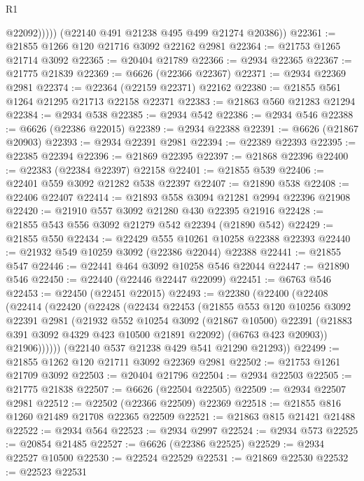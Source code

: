 \begin{lexlean}{R1}
\begin{coremodule}
                @22092)))))
      (@22140 @491 @21238 @495 @499 @21274 @20386))
@22361 := @21855 @1266 @120 @21716 @3092 @22162 @2981
@22364 := @21753 @1265 @21714 @3092
@22365 := @20404 @21789
@22366 := @2934 @22365
@22367 := @21775 @21839
@22369 := @6626 (@22366 @22367)
@22371 := @2934 @22369 @2981
@22374 := @22364 (@22159 @22371) @22162
@22380 := @21855 @561 @1264 @21295 @21713 @22158 @22371
@22383 := @21863 @560 @21283 @21294
@22384 := @2934 @538
@22385 := @2934 @542
@22386 := @2934 @546
@22388 := @6626 (@22386 @22015)
@22389 := @2934 @22388
@22391 := @6626 (@21867 @20903)
@22393 := @2934 @22391 @2981
@22394 := @22389 @22393
@22395 := @22385 @22394
@22396 := @21869 @22395
@22397 := @21868 @22396
@22400 := @22383 (@22384 @22397) @22158
@22401 := @21855 @539
@22406 := @22401 @559 @3092 @21282 @538 @22397
@22407 := @21890 @538
@22408 := @22406 @22407
@22414 := @21893 @558 @3094 @21281 @2994 @22396 @21908
@22420 := @21910 @557 @3092 @21280 @430 @22395 @21916
@22428 := @21855 @543 @556 @3092 @21279 @542 @22394 (@21890 @542)
@22429 := @21855 @550
@22434 := @22429 @555 @10261 @10258 @22388 @22393
@22440 := @21932 @549 @10259 @3092 (@22386 @22044) @22388
@22441 := @21855 @547
@22446 := @22441 @464 @3092 @10258 @546 @22044
@22447 := @21890 @546
@22450 := @22440 (@22446 @22447 @22099)
@22451 := @6763 @546
@22453 := @22450 (@22451 @22015)
@22493 := @22380
    (@22400
      (@22408
        (@22414
          (@22420
            (@22428
              (@22434
                @22453
                (@21855
                  @553
                  @120
                  @10256
                  @3092
                  @22391
                  @2981
                  (@21932
                    @552
                    @10254
                    @3092
                    (@21867 @10500)
                    @22391
                    (@21883 @391 @3092 @4329 @423 @10500 @21891 @22092)
                    (@6763 @423 @20903))
                  @21906))))))
      (@22140 @537 @21238 @429 @541 @21290 @21293))
@22499 := @21855 @1262 @120 @21711 @3092 @22369 @2981
@22502 := @21753 @1261 @21709 @3092
@22503 := @20404 @21796
@22504 := @2934 @22503
@22505 := @21775 @21838
@22507 := @6626 (@22504 @22505)
@22509 := @2934 @22507 @2981
@22512 := @22502 (@22366 @22509) @22369
@22518 := @21855 @816 @1260 @21489 @21708 @22365 @22509
@22521 := @21863 @815 @21421 @21488
@22522 := @2934 @564
@22523 := @2934 @2997
@22524 := @2934 @573
@22525 := @20854 @21485
@22527 := @6626 (@22386 @22525)
@22529 := @2934 @22527 @10500
@22530 := @22524 @22529
@22531 := @21869 @22530
@22532 := @22523 @22531

\end{coremodule}
\end{lexlean}
